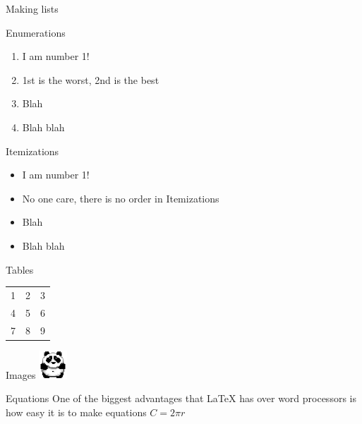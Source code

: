 \documentclass{refman}
\begin{document}
\begin{section}{Making lists}

  \begin{subsection}{Enumerations}
    \begin{enumerate}
      \item{I am number 1!}
      \item{1st is the worst, 2nd is the best}
      \item{Blah}
      \item{Blah blah}
    \end{enumerate}
  \end{subsection}

  \begin{subsection}{Itemizations}
    \begin{itemize}
      \item{I am number 1!}
      \item{No one care, there is no order in Itemizations}
      \item{Blah}
      \item{Blah blah}
    \end{itemize}
  \end{subsection}

  \begin{subsection}{Tables}
    \begin{tabular}{ l c r }
      1 & 2 & 3 \\
      4 & 5 & 6 \\
      7 & 8 & 9 \\
    \end{tabular}
  \end{subsection}

  \begin{subsection}{Images}
    \includegraphics[width=40px]{./panda_icon.png}
  \end{subsection}

  \begin{subsection}{Equations}
    One of the biggest advantages that {\LaTeX} has over word processors is how
    easy it is to make equations
    $ C = 2 \pi r$


\end{subsection}
\end{section}
\end{document}
